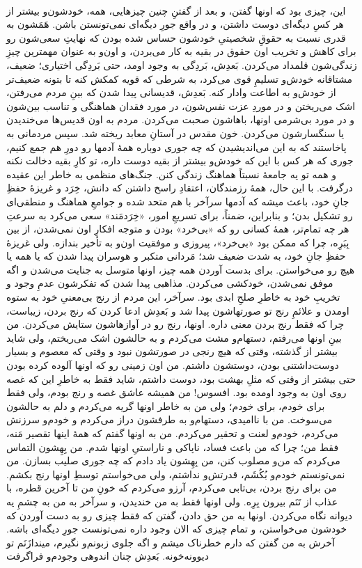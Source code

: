 \documentclass[12pt]{book}
\begin{document}
    \paragraph{}
    این، چیزی بود که اونها گفتن، و بعد از گفتنِ چنین چیزهایی، همه، خودشون‌و بیشتر از هر کسِ دیگه‌ای دوست داشتن، و در واقع جورِ دیگه‌ای نمی‌تونستن باشن. هَمَشون به قدری نسبت به حقوقِ شخصیتیِ خودشون حساس شده بودن که نهایتِ سعی‌شون رو برای کاهش و تخریب اون حقوق در بقیه به کار می‌بردن، و اون‌و به عنوان مهمترین چیزِ زندگی‌شون قلمداد می‌کردن. بَعدِش، بَردِگی به وجود اومد، حتی بَردِگی اختیاری؛ ضعیف، مشتاقانه خودش‌و تسلیمِ قوی می‌کرد، به شرطی که قویه کمکش کنه تا بتونه ضعیف‌تر از خودش‌و به اطاعت وادار کنه. بَعدِش، قدیسانی پیدا شدن که بینِ مردم می‌رفتن، اشک می‌ریختن و در موردِ عزت نفس‌شون، در مورد فقدان هماهنگی و تناسب بین‌شون و در مورد بی‌شرمی اونها، باهاشون صحبت می‌کردن. مردم به اون قدیس‌ها می‌خندیدن یا سنگسارشون می‌کردن. خون مقدس در آستانِ معابد ریخته شد. سپس مردمانی به پاخاستند که به این می‌اندیشیدن که چه جوری دوباره همهٔ آدمها رو دورِ هم جمع کنیم، جوری که هر کس با این که خودش‌و بیشتر از بقیه دوست داره، تو کارِ بقیه دخالت نکنه و همه تو یه جامعهٔ نسبتاً هماهنگ زندگی کنن. جنگ‌های منظمی به خاطر این عقیده درگرفت. با این حال، همهٔ رزمندگان، اعتقادِ راسخ داشتن که دانش، خِرَد و غریزهٔ حفظِ جانِ خود، باعث میشه که آدمها سرآخر با هم متحد شده و جوامعِ هماهنگ و منطقی‌ای رو تشکیل بدن؛ و بنابراین، ضمناً، برای تسریعِ امور، «خِرَدمَند» سعی می‌کرد به سرعتِ هر چه تمام‌تر، همهٔ کسانی رو که «بی‌خرد» بودن و متوجه افکارِ اون نمی‌شدن، از بین بِبَرِه، چرا که ممکن بود «بی‌خرد»، پیروزی و موفقیت اون‌و به تأخیر بندازه. ولی غریزهٔ حفظِ جانِ خود، به شدت ضعیف شد؛ مَردانی متکبر و هوسران پیدا شدن که یا همه یا هیچ رو می‌خواستن. برای بدست آوردن همه چیز، اونها متوسل به جنایت می‌شدن و اگه موفق نمی‌شدن، خودکشی می‌کردن. مذاهبی پیدا شدن که تفکرشون عدمِ وجود و تخریبِ خود به خاطرِ صلحِ ابدی بود. سرآخر، این مردم از رنج بی‌معنیِ خود به ستوه اومدن و علائمِ رنج تو صورتهاشون پیدا شد و بَعدِش ادعا کردن که رنج بردن، زیباست، چرا که فقط رنج بردن معنی داره. اونها، رنج رو در آوازهاشون ستایش می‌کردن. من بینِ اونها می‌رفتم، دستهام‌و مشت می‌کردم و به حالشون اشک می‌ریختم، ولی شاید بیشتر از گذشته، وقتی که هیچ رنجی در صورتشون نبود و وقتی که معصوم و بسیار دوست‌داشتنی بودن، دوستشون داشتم. من اون زمینی رو که اونها آلوده کرده بودن حتی بیشتر از وقتی که مثلِ بهشت بود، دوست داشتم، شاید فقط به خاطرِ این که غصه روی اون به وجود اومده بود. افسوس! من همیشه عاشق غصه و رنج بودم، ولی فقط برای خودم، برای خودم؛ ولی من به خاطر اونها گریه می‌کردم و دلم به حالشون می‌سوخت. من با ناامیدی، دستهام‌و به طرفشون دراز می‌کردم و خودم‌و سرزنش می‌کردم، خودم‌و لعنت و تحقیر می‌کردم. من به اونها گفتم که همهٔ اینها تقصیر مَنه، فقط من؛ چرا که من باعث فساد، ناپاکی و ناراستیِ اونها شدم. من بِهِشون التماس می‌کردم که من‌و مصلوب کنن، من بِهِشون یاد دادم که چه جوری صلیب بسازن. من نمی‌تونستم خودم‌و بُکُشَم، قدرتش‌و نداشتم، ولی می‌خواستم توسطِ اونها رنج بکشم. من برای رنج بردن، بی‌تابی می‌کردم، آرزو می‌کردم که خونِ من تا آخرین قطره، با عذاب از تَنَم بیرون بِرِه. ولی اونها فقط به من خندیدن، و سرآخر به من به چشمِ یه دیوانه نگاه می‌کردن. اونها به من حق دادن، گفتن که فقط چیزی رو به دست آوردن که خودشون می‌خواستن، و تمام چیزی که الان وجود داره نمی‌تونست جورِ دیگه‌ای باشه. آخرش به من گفتن که دارم خطرناک میشم و اگه جلوی زبونم‌و نگیرم، میندازَنَم تو دیوونه‌خونه. بَعدِش چنان اندوهی وجودم‌و فراگرفت 
\end{document}
